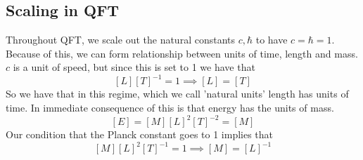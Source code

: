 \subsection{Scaling in QFT} 
Throughout QFT, we scale out the natural constants $c, \hbar$ to have $c = \hbar = 1$. Because of this, we can form relationship between units of time, length and mass. $c$ is a unit of speed, but since this is set to 1 we have that 
\[ 
[ L ][T]^{-1}  = 1 \implies [L]  = [T] 
\] 
So we have that in this regime, which we call 'natural units' length has units of time. In immediate consequence of this is that energy has the units of mass. 
\[ 
[ E]  = [M] [L]^2 [T]^{-2} = [M] 
\] 
Our condition that the Planck constant goes to 1 implies that \[ 
[ M ][ L]^2 [ T]^{ -1}  = 1 \implies [M ]  = [ L]^{ -1} 
\] 

\pagebreak 

